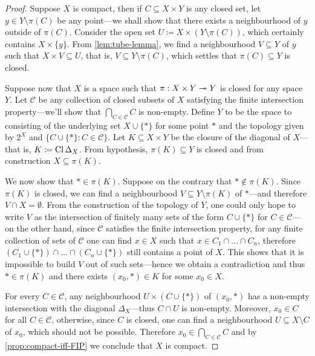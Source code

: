 \begin{proof}
    Suppose \(X\) is compact, then if \(C \subseteq X \times Y\) is any closed set,
    let \(y \in Y \setminus \pi(C)\) be any point---we shall show that there
    exists a neighbourhood of \(y\) outside of \(\pi(C)\). Consider the open set
    \(U \coloneq X \times (Y \setminus \pi(C))\), which certainly contains
    \(X \times \{y\}\). From \cref{lem:tube-lemma}, we find a neighbourhood
    \(V \subseteq Y\) of \(y\) such that \(X \times V \subseteq U\), that is,
    \(V \subseteq Y \setminus \pi(C)\), which settles that \(\pi(C) \subseteq Y\) is
    closed.

    Suppose now that \(X\) is a space such that \(\pi: X \times Y \twoheadrightarrow Y\) is closed
    for any space \(Y\). Let \(\mathcal{C}\) be any collection of closed subsets of
    \(X\) satisfying the finite intersection property---we'll show that
    \(\bigcap_{C \in \mathcal{C}} C\) is non-empty. Define \(Y\) to be the space to
    consisting of the underlying set \(X \cup \{*\}\) for some point \(*\) and the
    topology given by \(2^X\) and \(\{C \cup \{*\} \colon C \in \mathcal{C}\}\). Let
    \(K \subseteq X \times Y\) be the closure of the diagonal of \(X\)---that is,
    \(K \coloneq \operatorname{Cl} \Delta_X\). From hypothesis, \(\pi(K) \subseteq Y\) is
    closed and from construction \(X \subseteq \pi(K)\).

    We now show that \(* \in \pi(K)\). Suppose on the contrary that
    \(* \notin \pi(K)\). Since \(\pi(K)\) is closed, we can find a neighbourhood
    \(V \subseteq Y \setminus \pi(K)\) of \(*\)---and therefore
    \(V \cap X = \emptyset\). From the construction of the topology of \(Y\), one
    could only hope to write \(V\) as the intersection of finitely many sets of the
    form \(C \cup \{*\}\) for \(C \in \mathcal{C}\)---on the other hand, since
    \(\mathcal{C}\) satisfies the finite intersection property, for any finite
    collection of sets of \(\mathcal{C}\) one can find \(x \in X\) such that
    \(x \in C_1 \cap \dots \cap C_n\), therefore
    \((C_1 \cup \{*\}) \cap \dots \cap (C_n \cup \{*\})\) still contains a point of
    \(X\). This shows that it is impossible to build \(V\) out of such sets---hence
    we obtain a contradiction and thus \(* \in \pi(K)\) and there exists
    \((x_0, *) \in K\) for some \(x_0 \in X\).

    For every \(C \in \mathcal{C}\), any neighbourhood \(U \times (C \cup \{*\})\)
    of \((x_0, *)\) has a non-empty intersection with the diagonal
    \(\Delta_X\)---thus \(C \cap U\) is non-empty. Moreover, \(x_0 \in C\) for all
    \(C \in \mathcal{C}\), otherwise, since \(C\) is closed, one can find a
    neighbourhood \(U \subseteq X \setminus C\) of \(x_0\), which should not be
    possible. Therefore \(x_0 \in \bigcap_{C \in \mathcal{C}} C\) and by
    \cref{prop:compact-iff-FIP} we conclude that \(X\) is compact.
\end{proof}

